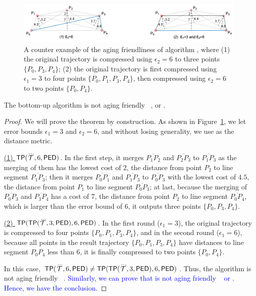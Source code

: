 \begin{figure}[tb!]
	\centering
	\includegraphics[scale=0.66]{Figures/Fig-aging-pavlidis.png}

	\caption{\small A counter example of the aging friendliness of algorithm \tpa, where (1) the original trajectory is compressed using $\epsilon_2=6$ to three points $\{P_0, P_3, P_4\}$; (2) the original trajectory is first compressed using $\epsilon_1=3$ to four points $\{P_0, P_1, P_3, P_4\}$, then compressed using $\epsilon_2=6$ to two points $\{P_0, P_4\}$. }
	\vspace{-1ex}
	\label{fig:aging-pavlidis}
\end{figure}


\begin{theorem}
\label{theo-aging-tp}
The bottom-up algorithm \tpa is not aging friendly \wrt~\ped, \sed or \dad.
\end{theorem}

\begin{proof}
We will prove the theorem by construction.
As shown in Figure~\ref{fig:aging-pavlidis}, we let error bounds $\epsilon_1 =3$ and $\epsilon_2=6$, and without losing generality, we use \ped as the distance metric.

\underline{(1) ${{\mathsf{TP}}}(\dddot{\mathcal{T}}, 6, {\mathsf{PED}})$}. In the first step, it merges $\overline{P_1P_2}$ and $\overline{P_2P_3}$ to $\overline{P_1P_3}$ as the merging of them has the lowest cost of $2$, the distance from point $P_2$ to line segment $\overline{P_1P_3}$; then it merges $\overline{P_0P_1}$ and $\overline{P_1P_3}$ to $\overline{P_0P_3}$ with the lowest cost of $4.5$, the distance from point $P_1$ to line segment $\overline{P_0P_3}$; at last, because the merging of $\overline{P_0P_3}$ and $\overline{P_3P_4}$ has a cost of $7$, the distance from point $P_2$ to line segment $\overline{P_0P_4}$, which is larger than the error bound of $6$, it outputs three points $\{P_0, P_3, P_4\}$.

\underline{(2) ${{\mathsf{TP}}}({\mathsf{TP}}(\dddot{\mathcal{T}}, 3, {\mathsf{PED}}), 6, {\mathsf{PED}})$}. In the first round ($\epsilon_1=3$), the original trajectory is compressed to four points $\{P_0, P_1, P_3, P_4\}$, and in the second round ($\epsilon_1=6$), because all points in the result trajectory $\{P_0, P_1, P_3, P_4\}$ have distances to line segment $P_0P_4$ less than $6$, it is finally compressed to two points $\{P_0, P_4\}$.

In this case, ${{\mathsf{TP}}}(\dddot{\mathcal{T}}, 6, {\mathsf{PED}}) \ne {{\ensuremath {\mathsf{TP}}}}({\mathsf{TP}}(\dddot{\mathcal{T}}, 3, {\mathsf{PED}}), 6, {\mathsf{PED}})$. Thus, the \tpa algorithm is not aging friendly \wrt~\ped.
\textcolor{blue}{Similarly, we can prove that \tpa is not aging friendly \wrt~ \sed or \dad. Hence, we have the conclusion.}
\end{proof}

